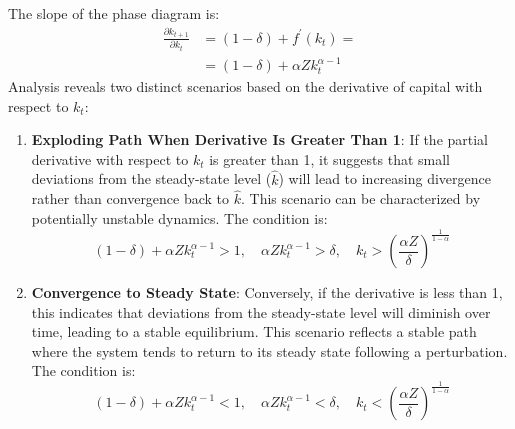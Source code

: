 \documentclass[12pt]{report}
\begin{document}
The slope of the phase diagram is:
\begin{align}
    \frac{\partial k_{t+1}}{\partial k_{t}} &= (1-\delta) + f^{\prime}(k_{t}) = \\
     &= (1-\delta) + \alpha Z k_{t}^{\alpha-1} \label{eq8}
\end{align}
Analysis reveals two distinct scenarios based on the derivative of capital with respect to \(k_{t}\):
\begin{enumerate}
    \item \textbf{Exploding Path When Derivative Is Greater Than 1}: If the partial derivative with respect to \(k_{t}\) is greater than 1, it suggests that small deviations from the
    steady-state level (\(\widehat{k}\)) will lead to increasing divergence rather than convergence back to
    \(\widehat{k}\). This scenario can be characterized by potentially unstable dynamics. The condition is:
    \[
    (1-\delta) + \alpha Z k_{t}^{\alpha-1} > 1, \quad \alpha Z k_{t}^{\alpha-1} > \delta, \quad k_{t} > \left(\frac{\alpha Z}{\delta}\right)^{\frac{1}{1-\alpha}}
    \]

    \item \textbf{Convergence to Steady State}: Conversely, if the derivative is less than 1, this indicates
    that deviations from the steady-state level will
    diminish over time, leading to a stable equilibrium. This scenario reflects a stable path where the system tends to
    return to its steady state following a perturbation.   The condition is:
    \[
    (1-\delta) + \alpha Z k_{t}^{\alpha-1} < 1, \quad \alpha Z k_{t}^{\alpha-1} < \delta, \quad k_{t} < \left(\frac{\alpha Z}{\delta}\right)^{\frac{1}{1-\alpha}}
    \]

\end{enumerate}
\end{document}
